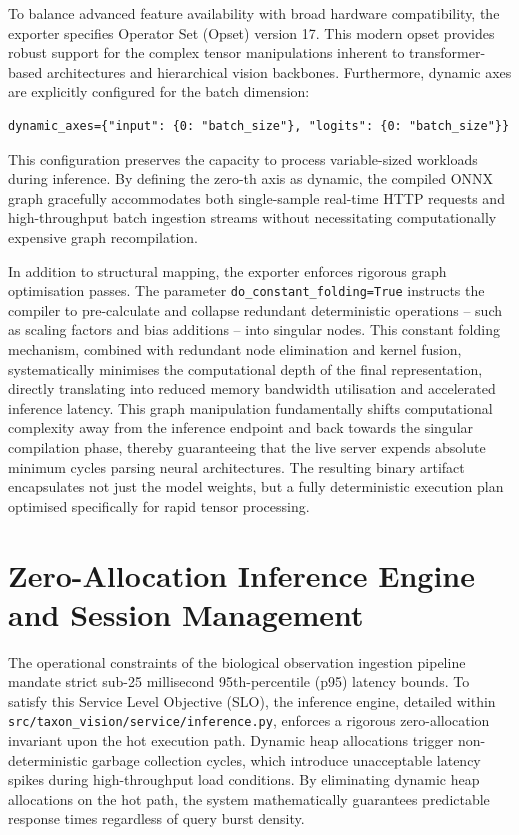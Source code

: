 To balance advanced feature availability with broad hardware compatibility, the exporter specifies Operator Set (Opset) version 17. This modern opset provides robust support for the complex tensor manipulations inherent to transformer-based architectures and hierarchical vision backbones. Furthermore, dynamic axes are explicitly configured for the batch dimension:
\begin{verbatim}
dynamic_axes={"input": {0: "batch_size"}, "logits": {0: "batch_size"}}
\end{verbatim}
This configuration preserves the capacity to process variable-sized workloads during inference. By defining the zero-th axis as dynamic, the compiled ONNX graph gracefully accommodates both single-sample real-time HTTP requests and high-throughput batch ingestion streams without necessitating computationally expensive graph recompilation.

In addition to structural mapping, the exporter enforces rigorous graph optimisation passes. The parameter \texttt{do\_constant\_folding=True} instructs the compiler to pre-calculate and collapse redundant deterministic operations -- such as scaling factors and bias additions -- into singular nodes. This constant folding mechanism, combined with redundant node elimination and kernel fusion, systematically minimises the computational depth of the final representation, directly translating into reduced memory bandwidth utilisation and accelerated inference latency. This graph manipulation fundamentally shifts computational complexity away from the inference endpoint and back towards the singular compilation phase, thereby guaranteeing that the live server expends absolute minimum cycles parsing neural architectures. The resulting binary artifact encapsulates not just the model weights, but a fully deterministic execution plan optimised specifically for rapid tensor processing.

\section{Zero-Allocation Inference Engine and Session Management}
\label{sec:zero_allocation_inference_engine}

The operational constraints of the biological observation ingestion pipeline mandate strict sub-25 millisecond 95th-percentile (p95) latency bounds. To satisfy this Service Level Objective (SLO), the inference engine, detailed within \texttt{src/taxon\_vision/service/inference.py}, enforces a rigorous zero-allocation invariant upon the hot execution path. Dynamic heap allocations trigger non-deterministic garbage collection cycles, which introduce unacceptable latency spikes during high-throughput load conditions. By eliminating dynamic heap allocations on the hot path, the system mathematically guarantees predictable response times regardless of query burst density.

